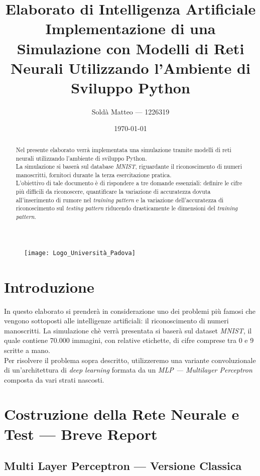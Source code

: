 \documentclass[12pt, a4paper]{article}
\title{\textbf{Elaborato di Intelligenza Artificiale} \\ Implementazione di una Simulazione con Modelli di Reti Neurali Utilizzando l'Ambiente di Sviluppo Python}
\author{Soldà Matteo --- 1226319}
\date{\today}
\begin{document}
\begin{figure}
    \centering
    \texttt{[image: Logo\_Università\_Padova]}
\end{figure}

\maketitle

\newpage
\begin{abstract}
Nel presente elaborato verrà implementata una simulazione tramite modelli di reti neurali utilizzando l'ambiente di sviluppo Python.\\
La simulazione si baserà sul database \textit{MNIST}, riguardante il riconoscimento di numeri manoscritti, fornitoci durante la terza esercitazione pratica.\\
L'obiettivo di tale documento è di rispondere a tre domande essenziali: definire le cifre più difficili da riconoscere, quantificare la variazione di accuratezza dovuta all'inserimento di rumore nel \textit{training pattern} e la variazione dell'accuratezza di riconoscimento sul \textit{testing pattern} riducendo drasticamente le dimensioni del \textit{training pattern}.    
\end{abstract}

\newpage
\tableofcontents

\newpage
\section{Introduzione}
In questo elaborato si prenderà in considerazione uno dei problemi più famosi che vengono sottoposti alle intelligenze artificiali: il riconoscimento di numeri manoscritti.
La simulazione chè verrà presentata si baserà sul dataset \textit{MNIST}, il quale contiene 70.000 immagini, con relative etichette, di cifre comprese tra 0 e 9 scritte a mano.\\
Per risolvere il problema sopra descritto, utilizzeremo una variante convoluzionale di un'architettura di \textit{deep learning} formata da un \textit{MLP --- Multilayer Perceptron} composta da vari strati nascosti.

\newpage
\section{Costruzione della Rete Neurale e Test --- Breve Report}
\subsection{Multi Layer Perceptron --- Versione Classica}
\end{document}
